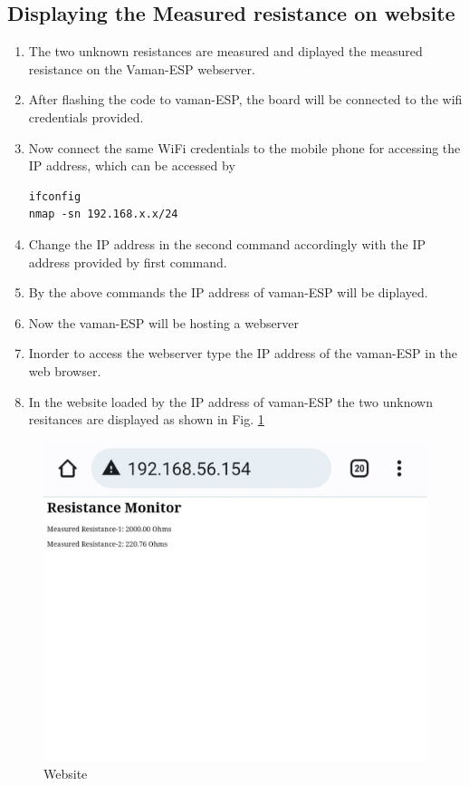 \subsection{Displaying the Measured resistance on website}
\begin{enumerate}[label=\thesection.\arabic*.,ref=\thesection.\theenumi]
\item The two unknown resistances are measured and diplayed the measured resistance on the Vaman-ESP webserver.
\item After flashing the code to vaman-ESP, the board will be connected to the wifi credentials provided.
\item Now connect the same WiFi credentials to the mobile phone for accessing the IP address, which can be accessed by 
\begin{lstlisting}
ifconfig
nmap -sn 192.168.x.x/24
\end{lstlisting}
\item Change the IP address in the second command accordingly with the IP address provided by first command.
\item By the above commands the IP address of vaman-ESP will be diplayed.
\item Now the vaman-ESP will be hosting a webserver
\item Inorder to access the webserver type the IP address of the vaman-ESP in the web browser.
\item In the website loaded by the IP address of vaman-ESP the two unknown resitances are displayed as shown in Fig. \ref{fig:website_results}
\end{enumerate}

\begin{figure}[H]
\centering
\includegraphics[width=\columnwidth]{./vaman/vaman-esp/I2C_resistance/figs/website.jpeg}
\caption{Website}
\label{fig:website_results}
\end{figure}
